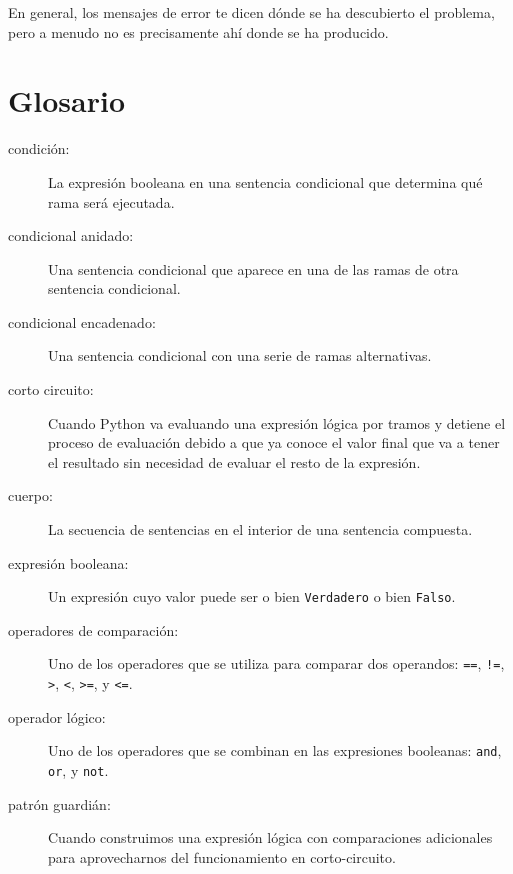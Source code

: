 
En general, los mensajes de error te dicen dónde se ha descubierto el problema,
pero a menudo no es precisamente ahí donde se ha producido.


\section{Glosario}

\begin{description}

\item[condición:] La expresión booleana en una sentencia condicional
que determina qué rama será ejecutada.

\item[condicional anidado:]  Una sentencia condicional que aparece
en una de las ramas de otra sentencia condicional.

\item[condicional encadenado:]  Una sentencia condicional con una serie
de ramas alternativas.
	
\item[corto circuito:]  Cuando Python va evaluando una expresión lógica
por tramos y detiene el proceso de evaluación debido a que ya
conoce el valor final que va a tener el resultado
sin necesidad de evaluar el resto de la expresión.

\item[cuerpo:] La secuencia de sentencias en el interior de una sentencia compuesta.

\item[expresión booleana:]  Un expresión cuyo valor puede ser o bien 
{\tt Verdadero} o bien {\tt Falso}.

\item[operadores de comparación:] Uno de los operadores que se utiliza para comparar
dos operandos: {\tt ==}, {\tt !=}, {\tt >}, {\tt <}, {\tt >=}, y {\tt <=}.

\item[operador lógico:] Uno de los operadores que se combinan en las expresiones
booleanas: {\tt and}, {\tt or}, y {\tt not}.

\item[patrón guardián:] Cuando construimos una expresión lógica
con comparaciones adicionales
para aprovecharnos del funcionamiento en corto-circuito.


\end{description}
